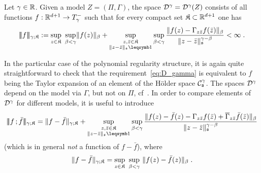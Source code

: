\documentclass[reqno,11pt]{article}
\def\normDgamma#1{|\!|\!|#1|\!|\!|}
\def\seminormff#1#2{|\!|\!|#1\,\mathord{;}\,#2|\!|\!|}
\def\fraks{\mathfrak{s}}
\def\fraK{\mathfrak{K}}
\def\Gammabar{\overline\Gamma}
\begin{document}
\begin{definition}
\label{def:D_gamma}
Let $\gamma\in\mathbb{R}$. Given a model $Z=(\Pi,\Gamma)$, the space ${\mathcal D}^\gamma =
{\mathcal D}^\gamma(Z)$ consists of all functions $f:\mathbb{R}^{d+1}\to T_\gamma^-$ such
that for every compact set $\fraK\subset\R^{d+1}$ one has 
\begin{equation}
 \label{eq:D_gamma}
 \normDgamma{f}_{\gamma;\fraK} := 
 \sup_{z\in\fraK}~ \sup_{\beta < \gamma} \norm{f(z)}_\beta 
 + \sup_{\substack{z,\bar z\in\fraK\\ 
 \norm{z-\bar z}_{\fraks}\leqs1}}
 \sup_{\beta<\gamma}\frac{\norm{f(z)-\Gamma_{z\bar z}f(\bar z)}_\beta}
 {\norm{z-\bar z}^{\gamma-\beta}_{\fraks}} < \infty\;.
\end{equation}
\end{definition}

In the particular case of the polynomial regularity structure, it is again quite
straightforward to check that the requirement~\eqref{eq:D_gamma} is equivalent
to $f$ being the Taylor expansion of an element of the H\"older space
$\cC^\gamma_\fraks$. The spaces ${\mathcal D}^\gamma$ depend on the model via $\Gamma$,
but not on $\Pi$, cf~\cite[Remark~3.4]{Hairer2014}. In order to compare
elements
of ${\mathcal D}^\gamma$ for different models, it is useful to introduce
\begin{equation}
 \label{eq:D_gamma_seminorm}
 \seminormff{f}{\bar f}_{\gamma;\fraK}
 = \norm{f-\bar f}_{\gamma;\fraK} 
 + \sup_{\substack{z,\bar z\in\fraK \\ \norm{z-\bar z}_{\fraks}\leqs1}}
 \sup_{\beta < \gamma}
 \frac{\norm{f(z) - \bar f(z) - \Gamma_{z\bar z}f(\bar z) +
\Gammabar_{z\bar z}\bar f(\bar z)}_\beta}{\norm{z-\bar
z}_{\fraks}^{\gamma-\beta}}
\end{equation}
(which is in general \emph{not} a function of $f-\bar f$), where 
\begin{equation}
 \label{eq:D_gamma_normf}
 \norm{f-\bar f}_{\gamma;\fraK} 
 = \sup_{z\in\fraK}~ \sup_{\beta < \gamma}
 ~\norm{f(z) - \bar f(z)}_\beta\;.
\end{equation}
\end{document}
